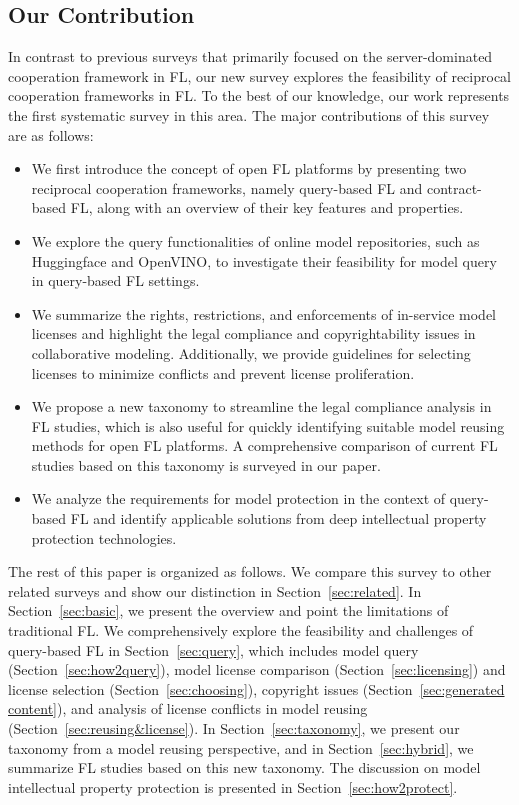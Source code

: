 \subsection{Our Contribution}
  In contrast to previous surveys that primarily focused on the server-dominated cooperation framework in FL,  our new survey explores the feasibility of reciprocal cooperation frameworks in FL.
  To the best of our knowledge, our work represents the first systematic survey in this area.
  The major contributions of this survey are as follows:
  \begin{itemize}
      \item We first introduce the concept of open FL platforms by presenting two reciprocal cooperation frameworks, namely query-based FL and contract-based FL, along with an overview of their key features and properties.
      \item We explore the query functionalities of online model repositories, such as Huggingface and OpenVINO, to investigate their feasibility for model query in query-based FL settings.
      \item We summarize the rights, restrictions, and enforcements of in-service model licenses and highlight the legal compliance and copyrightability issues in collaborative modeling. Additionally, we provide guidelines for selecting licenses to minimize conflicts and prevent license proliferation.
      \item We propose a new taxonomy to streamline the legal compliance analysis in FL studies, which is also useful for quickly identifying suitable model reusing methods for open FL platforms. A comprehensive comparison of current FL studies based on this taxonomy is surveyed in our paper.
      \item We analyze the requirements for model protection in the context of query-based FL and identify applicable solutions from deep intellectual property protection technologies.
\end{itemize}
  
The rest of this paper is organized as follows. 
We compare this survey to other related surveys and show our distinction in Section~\ref{sec:related}. 
In Section~\ref{sec:basic}, we present the overview and point the limitations of traditional FL.
We comprehensively explore the feasibility and challenges of query-based FL in Section~\ref{sec:query}, which includes model query (Section~\ref{sec:how2query}), model license comparison (Section~\ref{sec:licensing}) and license selection (Section~\ref{sec:choosing}), copyright issues (Section~\ref{sec:generated content}), and analysis of license conflicts in model reusing (Section~\ref{sec:reusing&license}).
In Section~\ref{sec:taxonomy}, we present our taxonomy from a model reusing perspective, and in Section~\ref{sec:hybrid}, we summarize FL studies based on this new taxonomy.
The discussion on model intellectual property protection is presented in Section~\ref{sec:how2protect}.


